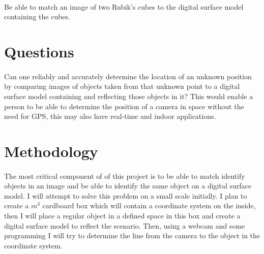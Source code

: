 \documentclass{article}
\begin{document}
\paragraph{}
Be able to match an image of two Rubik's cubes to the digital surface model containing the cubes.

\newpage

\section{Questions}
\paragraph{}
Can one reliably and accurately determine the location of an unknown position by comparing images of objects taken from that unknown point to a digital surface model containing and reflecting those objects in it? This would enable a person to be able to determine the position of a camera in space without the need for GPS, this may also have real-time and indoor applications.

\newpage

\section{Methodology}

\paragraph{}
The most critical component of of this project is to be able to match identify objects in an image and be able to identify the same object on a digital surface model. I will attempt to solve this problem on a small scale initially. I plan to create a $m^3$ cardboard box which will contain a coordinate system on the inside, then I will place a regular object in a defined space in this box and create a digital surface model to reflect the scenario. Then, using a webcam and some programming I will try to determine the line from the camera to the object in the coordinate system. 
\end{document}
